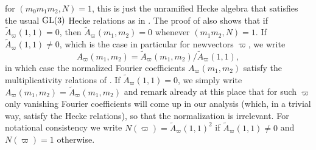 \documentclass[11pt]{amsart}
\theoremstyle{plain}
\numberwithin{equation}{section}
\theoremstyle{definition}
\begin{document}
for  $(m_0m_1 m_2, N) = 1$, this is just the unramified Hecke algebra that satisfies the  usual ${\rm GL}(3)$ Hecke relations as in \cite[Theorem 6.4.11]{Go}. The proof of \cite[Theorem 6.4.11]{Go} also shows that if $\tilde{A}_{\varpi}(1, 1) = 0$, then $\tilde{A}_{\varpi}(m_1, m_2) = 0$ whenever $(m_1m_2, N) =1$. If $\tilde{A}_{\varpi}(1, 1)\not= 0$, which  is the case in particular for newvectors $\varpi$, we write 
\begin{equation}\label{four1}
A_{\varpi}(m_1, m_2) = \tilde{A}_{\varpi}(m_1, m_2)/\tilde{A}_{\varpi}(1, 1),
\end{equation}
 in which case the normalized Fourier coefficients $A_{\varpi}(m_1, m_2) $ satisfy the multiplicativity relations of \cite[Theorem 6.4.11]{Go}. If $\tilde{A}_{\varpi}(1, 1)= 0$, we simply write $A_{\varpi}(m_1, m_2) = \tilde{A}_{\varpi}(m_1, m_2)$ and remark already at this place that for such $\varpi$ only vanishing Fourier coefficients will come up in our analysis (which, in a trivial way, satisfy the Hecke relations), so that the normalization is irrelevant. For notational consistency we write $N(\varpi) = \tilde{A}_{\varpi}(1, 1)^{2}$ if $\tilde{A}_{\varpi}(1, 1) \not=0$ and $N(\varpi) = 1$ otherwise.
\end{document}
